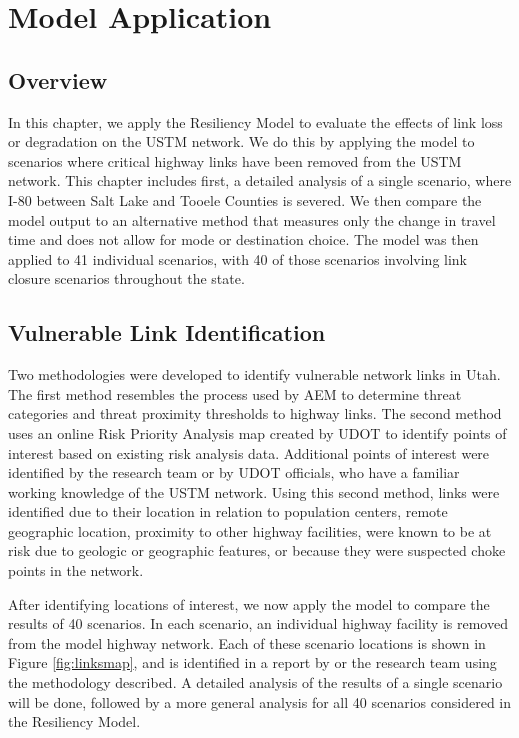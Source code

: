 \chapter{Model Application}
\label{chp:chapter4}
\graphicspath{{figures/}{figures/chapter4/}}

\section{Overview}
In this chapter, we apply the Resiliency Model to evaluate the effects of link
loss or degradation on the USTM network. We do this by applying the model to scenarios
where critical highway links have been removed from the USTM network. This
chapter includes first, a detailed analysis of a single scenario, where I-80
between Salt Lake and Tooele Counties is severed. We then compare the model
output to an alternative method that measures only the change in travel
time and does not allow for mode or destination choice. The model was then
applied to 41 individual scenarios, with 40 of those scenarios involving link
closure scenarios throughout the state.

\section{Vulnerable Link Identification}
Two methodologies were developed to identify vulnerable network links in
Utah. The first method resembles the process used by AEM to determine
threat categories and threat proximity thresholds to highway links. The
second method uses an online Risk Priority Analysis map created by UDOT to identify points of interest based on existing risk analysis data. Additional
points of interest were identified by the research team or by UDOT officials, who have a familiar working knowledge of the USTM network. Using this second
method, links were identified due to their location in relation to
population centers, remote geographic location, proximity to other highway facilities, were known to be at risk due to geologic or geographic features, or
because they were suspected choke points in the network.

After identifying locations of interest, we now apply the model to compare the results of 40 scenarios. In each scenario, an individual highway
facility is removed from the model highway network. Each of these scenario locations is shown in Figure \ref{fig:linksmap}, and is identified in a report by
\cite{aem2017} or the research team using the methodology described. A detailed analysis of the results of a single scenario will be done, followed by a
more general analysis for all 40 scenarios considered in the Resiliency Model.

